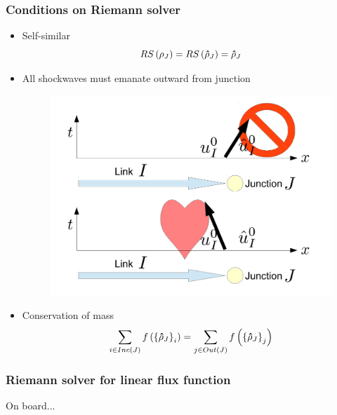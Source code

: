 \begin{frame}
\frametitle{Conditions on Riemann solver}

\begin{itemize}
    \item<1-> Self-similar
    \begin{equation}RS\left(\mathbf{\rho}_{J}\right)=RS\left(\mathbf{\hat{\rho}}_{J}\right)=\mathbf{\hat{\rho}}_{J}\end{equation}
    \item<2-> All shockwaves must emanate outward from junction
    \begin{figure}
    \includegraphics[width=.5\columnwidth]{figs-gen/shock}
    \end{figure}
    \item<3-> Conservation of mass
    \begin{equation}
    \sum_{i\in Inc\left(J\right)}f\left(\left\{ \mathbf{\hat{\rho}}_{J}\right\} _{i}\right)=\sum_{j\in Out\left(J\right)}f\left(\left\{ \mathbf{\hat{\rho}}_{J}\right\} _{j}\right)
    \end{equation}
\end{itemize}

\end{frame}


\begin{frame}
\frametitle{Riemann solver for linear flux function}
\begin{example}
On board...
\end{example}
\end{frame}
